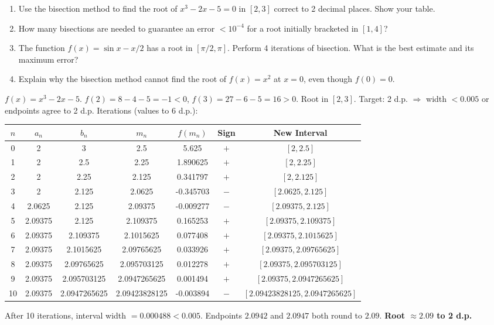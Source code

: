 \documentclass[11pt]{article}
\begin{document}
\begin{exercice}
\begin{enumerate}
    \item Use the bisection method to find the root of $x^3 - 2x - 5 = 0$ in $[2,3]$ correct to 2 decimal places. Show your table.
    \item How many bisections are needed to guarantee an error $< 10^{-4}$ for a root initially bracketed in $[1,4]$?
    \item The function $f(x)=\sin x - x/2$ has a root in $[\pi/2, \pi]$. Perform 4 iterations of bisection. What is the best estimate and its maximum error?
    \item Explain why the bisection method cannot find the root of $f(x)=x^2$ at $x=0$, even though $f(0)=0$.
\end{enumerate}
\end{exercice}

\begin{corrige}[Exercise 1]
$f(x)=x^3-2x-5$. $f(2)=8-4-5=-1 < 0$, $f(3)=27-6-5=16 > 0$. Root in $[2,3]$.
Target: 2 d.p. $\Rightarrow$ width $<0.005$ or endpoints agree to 2 d.p.
Iterations (values to 6 d.p.):
\begin{center}
\begin{tabular}{|c|c|c|c|c|c|c|}
\hline
$n$ & $a_n$ & $b_n$ & $m_n$ & $f(m_n)$ & Sign & New Interval \\ \hline
0 & 2 & 3 & 2.5 & 5.625 & $+$ & $[2, 2.5]$ \\ \hline
1 & 2 & 2.5 & 2.25 & 1.890625 & $+$ & $[2, 2.25]$ \\ \hline
2 & 2 & 2.25 & 2.125 & 0.341797 & $+$ & $[2, 2.125]$ \\ \hline
3 & 2 & 2.125 & 2.0625 & -0.345703 & $-$ & $[2.0625, 2.125]$ \\ \hline
4 & 2.0625 & 2.125 & 2.09375 & -0.009277 & $-$ & $[2.09375, 2.125]$ \\ \hline
5 & 2.09375 & 2.125 & 2.109375 & 0.165253 & $+$ & $[2.09375, 2.109375]$ \\ \hline
6 & 2.09375 & 2.109375 & 2.1015625 & 0.077408 & $+$ & $[2.09375, 2.1015625]$ \\ \hline
7 & 2.09375 & 2.1015625 & 2.09765625 & 0.033926 & $+$ & $[2.09375, 2.09765625]$ \\ \hline
8 & 2.09375 & 2.09765625 & 2.095703125 & 0.012278 & $+$ & $[2.09375, 2.095703125]$ \\ \hline
9 & 2.09375 & 2.095703125 & 2.0947265625 & 0.001494 & $+$ & $[2.09375, 2.0947265625]$ \\ \hline
10 & 2.09375 & 2.0947265625 & 2.09423828125 & -0.003894 & $-$ & $[2.09423828125, 2.0947265625]$ \\ \hline
\end{tabular}
\end{center}
After 10 iterations, interval width $= 0.000488 < 0.005$. Endpoints $2.0942$ and $2.0947$ both round to $2.09$.
\textbf{Root $\approx 2.09$ to 2 d.p.}
\end{corrige}
\end{document}
